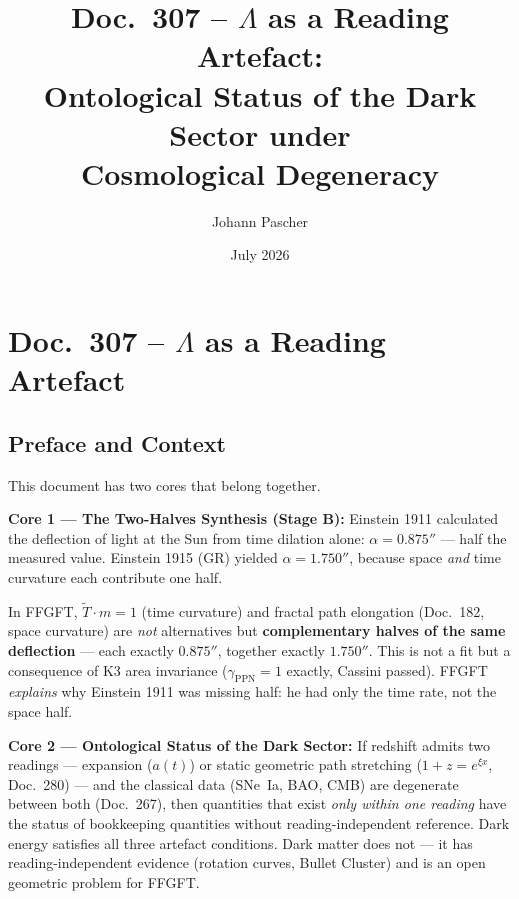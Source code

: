 \documentclass[11pt]{report}
\title{Doc.~307 -- $\Lambda$ as a Reading Artefact:\\
Ontological Status of the Dark Sector under\\
Cosmological Degeneracy}
\author{Johann Pascher}
\date{July 2026}
\begin{document}
\maketitle
\tableofcontents

\chapter*{Doc.~307 -- $\Lambda$ as a Reading Artefact}

\section*{Preface and Context}

This document has two cores that belong together.

\medskip
\noindent\textbf{Core 1 — The Two-Halves Synthesis (Stage B):}
Einstein 1911 calculated the deflection of light at the Sun from
time dilation alone: $\alpha = 0.875''$ — half the measured value.
Einstein 1915 (GR) yielded $\alpha = 1.750''$, because space
\emph{and} time curvature each contribute one half.

In FFGFT, $\tilde T \cdot m = 1$ (time curvature) and fractal path
elongation (Doc.~182, space curvature) are \emph{not} alternatives
but \textbf{complementary halves of the same deflection} — each
exactly $0.875''$, together exactly $1.750''$. This is not a fit but
a consequence of K3 area invariance ($\gamma_\text{PPN} = 1$ exactly,
Cassini passed). FFGFT \emph{explains} why Einstein 1911 was missing
half: he had only the time rate, not the space half.

\medskip
\noindent\textbf{Core 2 — Ontological Status of the Dark Sector:}
If redshift admits two readings — expansion ($a(t)$) or static
geometric path stretching ($1+z = e^{\xi x}$, Doc.~280) — and the
classical data (SNe~Ia, BAO, CMB) are degenerate between both
(Doc.~267), then quantities that exist \emph{only within one reading}
have the status of bookkeeping quantities without reading-independent
reference.
Dark energy satisfies all three artefact conditions. Dark matter does
not — it has reading-independent evidence (rotation curves, Bullet
Cluster) and is an open geometric problem for FFGFT.
\end{document}
